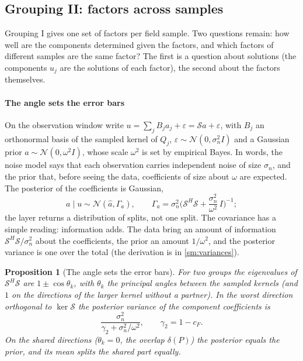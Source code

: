 \documentclass[11pt]{article}
\theoremstyle{plain}
\newtheorem{proposition}[theorem]{Proposition}
\theoremstyle{definition}
\theoremstyle{remark}
\newcommand{\sumop}{\mathcal{S}}            %
\newcommand{\cF}{c_{F}}                     %
\newcommand{\deltaP}{\delta(P)}             %
\newcommand{\noise}{\sigma_{n}}             %
\newcommand{\Normal}{\mathcal{N}}
\newcommand{\SMvariances}{\cref{sm:variances}}
\begin{document}
\subsection{Grouping II: factors across samples}\label{sec:group2}
Grouping I gives one set of factors per field sample. Two questions remain: how well are the components determined given
the factors, and which factors of different samples are the same factor? The first is a question about solutions (the components $u_j$ are the solutions of each factor), the second about
the factors themselves.

\paragraph{The angle sets the error bars} On the observation window write $u=\sum_jB_ja_j+\varepsilon=\sumop a+\varepsilon$,
with $B_j$ an orthonormal basis of the sampled kernel of $Q_j$, $\varepsilon\sim\Normal(0,\noise^2I)$ and a Gaussian prior
$a\sim\Normal(0,\omega^2I)$, whose scale $\omega^2$ is set by empirical Bayes. In words, the noise model says that each observation carries independent noise of size $\noise$, and the prior that,
before seeing the data, coefficients of size about $\omega$ are expected. The posterior of the coefficients is Gaussian,
\begin{equation}\label{eq:posterior-a}
  a\mid u\sim\Normal(\hat a,\Gamma_a),\qquad
  \Gamma_a=\noise^2\Big(\sumop^H\sumop+\frac{\noise^2}{\omega^2}\,I\Big)^{-1};
\end{equation}
the layer returns a distribution of splits, not one split. The covariance has a simple reading: information adds. The data bring an amount of information
$\sumop^H\sumop/\noise^2$ about the coefficients, the prior an amount $1/\omega^2$, and the posterior variance is one over
the total (the derivation is in \SMvariances).

\begin{proposition}[The angle sets the error bars]\label{prop:bayes-angle}
For two groups the eigenvalues of $\sumop^H\sumop$ are $1\pm\cos\theta_k$, with $\theta_k$ the principal angles between the
sampled kernels (and $1$ on the directions of the larger kernel without a partner). In the worst direction orthogonal to
$\ker\sumop$ the posterior variance of the component coefficients is
\begin{equation}\label{eq:bayes-angle}
  \frac{\noise^2}{\gamma_2+\noise^2/\omega^2},\qquad \gamma_2=1-\cF .
\end{equation}
On the shared directions ($\theta_k=0$, the overlap $\deltaP$) the posterior equals the prior, and its mean splits the
shared part equally.
\end{proposition}
\end{document}
